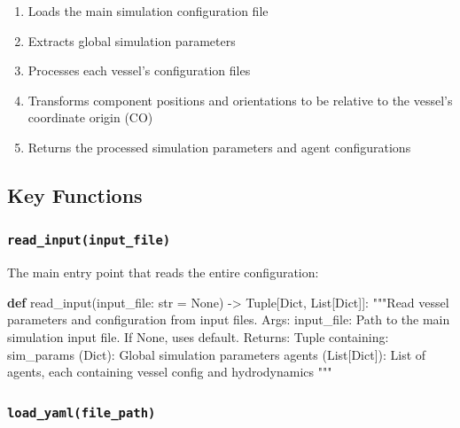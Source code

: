 \documentclass[
  letterpaper,
  DIV=11,
  numbers=noendperiod]{scrreprt}
\newenvironment{Shaded}{\begin{snugshade}}{\end{snugshade}}
\newcommand{\BuiltInTok}[1]{\textcolor[rgb]{0.00,0.23,0.31}{#1}}
\newcommand{\CommentTok}[1]{\textcolor[rgb]{0.37,0.37,0.37}{#1}}
\newcommand{\KeywordTok}[1]{\textcolor[rgb]{0.00,0.23,0.31}{\textbf{#1}}}
\newcommand{\NormalTok}[1]{\textcolor[rgb]{0.00,0.23,0.31}{#1}}
\newcommand{\OperatorTok}[1]{\textcolor[rgb]{0.37,0.37,0.37}{#1}}
\newcommand{\VariableTok}[1]{\textcolor[rgb]{0.07,0.07,0.07}{#1}}
\providecommand{\tightlist}{%
  \setlength{\itemsep}{0pt}\setlength{\parskip}{0pt}}\usepackage{longtable,booktabs,array}
\begin{document}
\begin{enumerate}
\def\labelenumi{\arabic{enumi}.}
\tightlist
\item
  Loads the main simulation configuration file
\item
  Extracts global simulation parameters
\item
  Processes each vessel's configuration files
\item
  Transforms component positions and orientations to be relative to the
  vessel's coordinate origin (CO)
\item
  Returns the processed simulation parameters and agent configurations
\end{enumerate}

\subsection*{Key Functions}\label{key-functions}

\subsubsection*{\texorpdfstring{\texttt{read\_input(input\_file)}}{read\_input(input\_file)}}\label{read_inputinput_file}

The main entry point that reads the entire configuration:

\begin{Shaded}
\begin{Highlighting}[]
\KeywordTok{def}\NormalTok{ read\_input(input\_file: }\BuiltInTok{str} \OperatorTok{=} \VariableTok{None}\NormalTok{) }\OperatorTok{{-}\textgreater{}}\NormalTok{ Tuple[Dict, List[Dict]]:}
    \CommentTok{"""Read vessel parameters and configuration from input files.}
\CommentTok{    }
\CommentTok{    Args:}
\CommentTok{        input\_file: Path to the main simulation input file. If None, uses default.}
\CommentTok{        }
\CommentTok{    Returns:}
\CommentTok{        Tuple containing:}
\CommentTok{            sim\_params (Dict): Global simulation parameters}
\CommentTok{            agents (List[Dict]): List of agents, each containing vessel config and hydrodynamics}
\CommentTok{    """}
\end{Highlighting}
\end{Shaded}

\subsubsection*{\texorpdfstring{\texttt{load\_yaml(file\_path)}}{load\_yaml(file\_path)}}\label{load_yamlfile_path}
\end{document}
